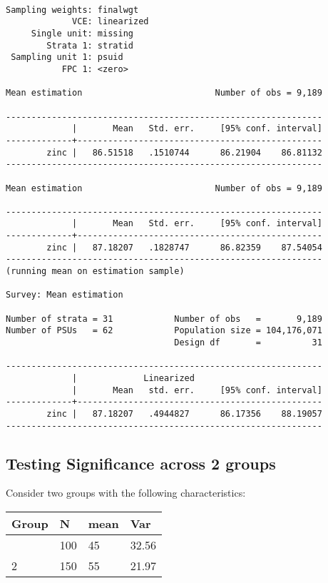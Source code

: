 \documentclass[
  letterpaper,
  DIV=11,
  numbers=noendperiod]{scrartcl}
\begin{document}
\begin{verbatim}

Sampling weights: finalwgt
             VCE: linearized
     Single unit: missing
        Strata 1: stratid
 Sampling unit 1: psuid
           FPC 1: <zero>

Mean estimation                          Number of obs = 9,189

--------------------------------------------------------------
             |       Mean   Std. err.     [95% conf. interval]
-------------+------------------------------------------------
        zinc |   86.51518   .1510744      86.21904    86.81132
--------------------------------------------------------------

Mean estimation                          Number of obs = 9,189

--------------------------------------------------------------
             |       Mean   Std. err.     [95% conf. interval]
-------------+------------------------------------------------
        zinc |   87.18207   .1828747      86.82359    87.54054
--------------------------------------------------------------
(running mean on estimation sample)

Survey: Mean estimation

Number of strata = 31            Number of obs   =       9,189
Number of PSUs   = 62            Population size = 104,176,071
                                 Design df       =          31

--------------------------------------------------------------
             |             Linearized
             |       Mean   std. err.     [95% conf. interval]
-------------+------------------------------------------------
        zinc |   87.18207   .4944827      86.17356    88.19057
--------------------------------------------------------------
\end{verbatim}

\subsection{Testing Significance across 2
groups}\label{testing-significance-across-2-groups}

Consider two groups with the following characteristics:

\begin{longtable}[]{@{}llll@{}}
\toprule\noalign{}
Group & N & mean & Var \\
\midrule\noalign{}
\endhead
\bottomrule\noalign{}
\endlastfoot
1 & 100 & 45 & 32.56 \\
2 & 150 & 55 & 21.97 \\
\end{longtable}
\end{document}
